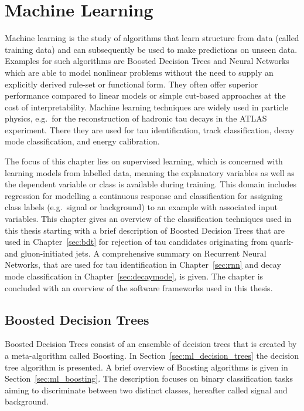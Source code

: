 \chapter{Machine Learning}
\label{sec:ml}

Machine learning is the study of algorithms that learn structure from data
(called training data) and can subsequently be used to make predictions on
unseen data. Examples for such algorithms are Boosted Decision Trees and Neural
Networks which are able to model nonlinear problems without the need to supply
an explicitly derived rule-set or functional form. They often offer superior
performance compared to linear models or simple cut-based approaches at the cost
of interpretability. Machine learning techniques are widely used in particle
physics, e.g.\ for the reconstruction of hadronic tau decays in the ATLAS
experiment. There they are used for tau identification, track classification,
decay mode classification, and energy calibration.

The focus of this chapter lies on supervised learning, which is concerned with
learning models from labelled data, meaning the explanatory variables as well as
the dependent variable or class is available during training. This domain
includes regression for modelling a continuous response and classification for
assigning class labels (e.g.\ signal or background) to an example with
associated input variables. This chapter gives an overview of the classification
techniques used in this thesis starting with a brief description of Boosted
Decision Trees that are used in Chapter~\ref{sec:bdt} for rejection of tau
candidates originating from quark- and gluon-initiated jets. A comprehensive
summary on Recurrent Neural Networks, that are used for tau identification in
Chapter~\ref{sec:rnn} and decay mode classification in
Chapter~\ref{sec:decaymode}, is given. The chapter is concluded with an overview
of the software frameworks used in this thesis.

\section{Boosted Decision Trees}
\label{sec:bdt_ml}

Boosted Decision Trees consist of an ensemble of decision trees that is created
by a meta-algorithm called Boosting. In Section~\ref{sec:ml_decision_trees} the
decision tree algorithm is presented. A brief overview of Boosting algorithms is
given in Section~\ref{sec:ml_boosting}. The description focuses on binary
classification tasks aiming to discriminate between two distinct classes,
hereafter called signal and background.

